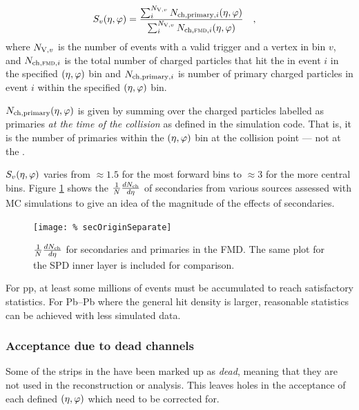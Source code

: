 \documentclass[11pt]{article}
\def\AlwaysText#1{\ifmmode\relax\text{#1}\else #1\fi}
\newcommand{\AbbrName}[1]{\AlwaysText{{\scshape #1}}}
\newcommand{\FMD}[1][]{\AbbrName{fmd\ifx|#1|\else#1\fi}}
\newcommand{\mult}[1][]{\ensuremath N_{\text{ch}#1}}
\newcommand{\dndeta}[1][]{{\ensuremath%
    \ifx|#1|\else\left.\fi%
    \frac{1}{N}\frac{d\mult{}}{d\eta}%
    \ifx|#1|\else\right|_{#1}\fi%
}}
\newcommand{\N}[2]{{\ensuremath N_{#1#2}}}
\newcommand{\NV}[1][]{\N{\text{V}}{#1}}
\newcommand{\etaphi}{\ensuremath(\eta,\varphi)}
\newcommand{\SecMap}{\ensuremath S_v\etaphi}
\begin{document}
\begin{align}
  \label{eq:secondary}
  \SecMap{} &=
  \frac{\sum_i^{\NV[,v]}\mult[,\text{primary},i]\etaphi}{
    \sum_i^{\NV[,v]}\mult[,\text{\FMD{}},i]\etaphi}\quad,
\end{align}
where $\NV[,v]$ is the number of events with a valid trigger and a
vertex in bin $v$, and $\mult[,\FMD{},i]$ is the total number of
charged particles that hit the \FMD{} in event $i$ in the specified
$\etaphi$ bin and $\mult[,\text{primary},i]$ is number of
primary charged particles in event $i$ within the specified
$\etaphi$ bin.

$\mult[,\text{primary}]\etaphi$ is given by summing over the
charged particles labelled as primaries \emph{at the time of the
  collision} as defined in the simulation code.  That is, it is the
number of primaries within the $\etaphi$ bin at the collision
point --- not at the \FMD{}.

$\SecMap$ varies from $\approx 1.5$ for the most forward bins to
$\approx 3$ for the more central bins. Figure \ref{secondaries} shows the $\dndeta$ of secondaries from various sources assessed with MC simulations to give an idea of the magnitude of the effects of secondaries. 
\begin{figure}[]
  \centering
  \texttt{[image: \%
    secOriginSeparate]}
  \caption{$\dndeta$ for secondaries and primaries in the FMD. The same plot for the SPD inner layer is included for comparison.}
  \label{secondaries}
\end{figure} 
 
For pp, at least some millions of events must be
accumulated to reach satisfactory statistics.  For Pb--Pb where the
general hit density is larger, reasonable statistics can be achieved
with less simulated data.   

\subsubsection{Acceptance due to dead channels}

Some of the strips in the \FMD{} have been marked up as \emph{dead},
meaning that they are not used in the reconstruction or analysis.
This leaves holes in the acceptance of each defined $\etaphi$
which need to be corrected for.  
\end{document}
